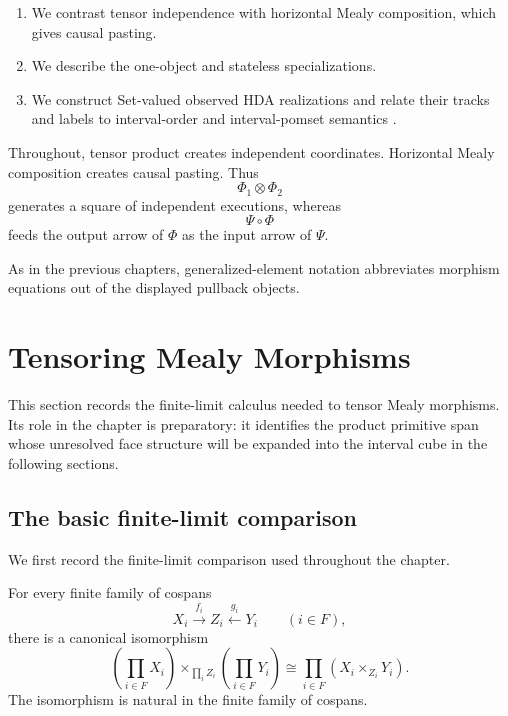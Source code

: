 \begin{enumerate}
    \item We contrast tensor independence with horizontal Mealy composition,
    which gives causal pasting.

    \item We describe the one-object and stateless specializations.

    \item We construct Set-valued observed HDA realizations and relate their
    tracks and labels to interval-order and interval-pomset semantics
    \cite{Pratt1991,Pratt2000,vanGlabbeek2006,FahrenbergJohansenStruthZiemianski2021,Fahrenberg_2024,ZouariZiemianskiFahrenberg2024,AmraneBazilleFahrenbergFortin2024}.
\end{enumerate}

Throughout, tensor product creates independent coordinates. Horizontal Mealy
composition creates causal pasting. Thus
\[
    \Phi_1\otimes\Phi_2
\]
generates a square of independent executions, whereas
\[
    \Psi\circ\Phi
\]
feeds the output arrow of \(\Phi\) as the input arrow of \(\Psi\).

As in the previous chapters, generalized-element notation abbreviates
morphism equations out of the displayed pullback objects.

\section{Tensoring Mealy Morphisms}
\label{sec:cmett-tensoring-mealy-morphisms}

This section records the finite-limit calculus needed to tensor Mealy
morphisms. Its role in the chapter is preparatory: it identifies the product
primitive span whose unresolved face structure will be expanded into the
interval cube in the following sections.

\subsection{The basic finite-limit comparison}
\label{subsec:cmett-basic-finite-limit-comparison}

We first record the finite-limit comparison used throughout the chapter.

\begin{lemma}
\label{lem:cmett-products-commute-displayed-pullbacks}
    For every finite family of cospans
    \[
        X_i\xrightarrow{f_i}Z_i\xleftarrow{g_i}Y_i
        \qquad (i\in F),
    \]
    there is a canonical isomorphism
    \[
        \left(\prod_{i\in F}X_i\right)
        \times_{\prod_i Z_i}
        \left(\prod_{i\in F}Y_i\right)
        \cong
        \prod_{i\in F}(X_i\times_{Z_i}Y_i).
    \]
    The isomorphism is natural in the finite family of cospans.
\end{lemma}

